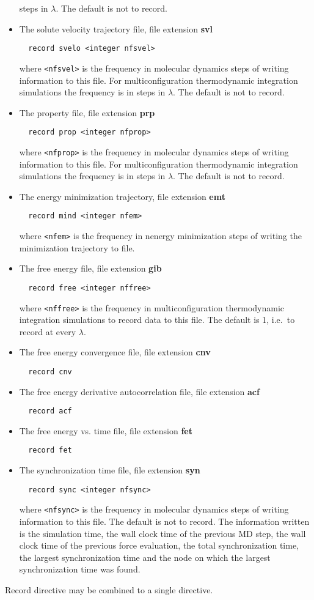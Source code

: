 \begin{itemize}
steps in $\lambda$. The default is not to record.
\item
The solute velocity trajectory file, file extension {\bf svl}
\begin{verbatim}
  record svelo <integer nfsvel>
\end{verbatim}
where \verb+<nfsvel>+ is the frequency in molecular dynamics steps
of writing information to this file. For multiconfiguration
thermodynamic integration simulations the frequency is in
steps in $\lambda$. The default is not to record.
\item
The property file, file extension {\bf prp}
\begin{verbatim}
  record prop <integer nfprop>
\end{verbatim}
where \verb+<nfprop>+ is the frequency in molecular dynamics steps
of writing information to this file. For multiconfiguration
thermodynamic integration simulations the frequency is in
steps in $\lambda$. The default is not to record.
\item
The energy minimization trajectory, file extension {\bf emt}
\begin{verbatim}
  record mind <integer nfem>
\end{verbatim}
where \verb+<nfem>+ is the frequency in nenergy minimization steps of
writing the minimization trajectory to file.
\item
The free energy file, file extension {\bf gib}
\begin{verbatim}
  record free <integer nffree>
\end{verbatim}
where \verb+<nffree>+ is the frequency in multiconfiguration
thermodynamic integration simulations to record data to this file.
The default is 1, i.e.\ to record at every $\lambda$.
\item
The free energy convergence file, file extension {\bf cnv}
\begin{verbatim}
  record cnv
\end{verbatim}
\item
The free energy derivative autocorrelation file, file extension {\bf acf}
\begin{verbatim}
  record acf
\end{verbatim}
\item
The free energy vs. time file, file extension {\bf fet}
\begin{verbatim}
  record fet
\end{verbatim}
\item
The synchronization time file, file extension {\bf syn}
\begin{verbatim}
  record sync <integer nfsync>
\end{verbatim}
where \verb+<nfsync>+ is the frequency in molecular dynamics steps
of writing information to this file. The default is not to record.
The information written is the simulation time, the wall clock time
of the previous MD step, the wall clock time of the previous force
evaluation, the total synchronization time, the largest
synchronization time and the node on which the largest synchronization
time was found.
\end{itemize}
Record directive may be combined to a single directive.

